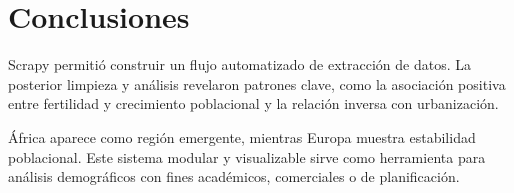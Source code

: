 \documentclass[12pt]{article}
\begin{document}
\section{Conclusiones}

Scrapy permitió construir un flujo automatizado de extracción de datos. La posterior limpieza y análisis revelaron patrones clave, como la asociación positiva entre fertilidad y crecimiento poblacional y la relación inversa con urbanización.

África aparece como región emergente, mientras Europa muestra estabilidad poblacional. Este sistema modular y visualizable sirve como herramienta para análisis demográficos con fines académicos, comerciales o de planificación.



\newpage

\printbibliography
\end{document}

